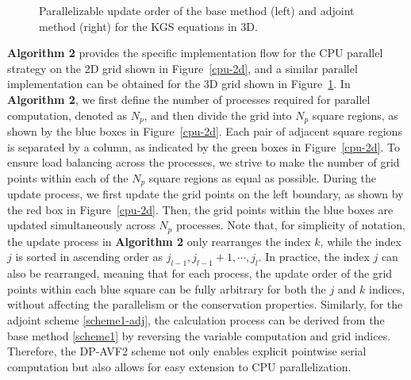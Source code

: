 \documentclass[fleqn,11pt]{elsarticle}
\numberwithin{equation}{section}
\begin{document}
\begin{figure}[H]
\begin{minipage}{0.45\textwidth}
	\end{minipage}


	\caption{Parallelizable update order of the base method (left) and adjoint method (right) for the KGS equations in 3D.}\label{cpu-3d}
\end{figure}


{\bf Algorithm 2} provides the specific implementation flow for the CPU parallel strategy on the 2D grid shown in Figure~\ref{cpu-2d}, and a similar parallel implementation can be obtained for the 3D grid shown in Figure~\ref{cpu-3d}. In {\bf Algorithm 2}, we first define the number of processes required for parallel computation, denoted as $N_p$, and then divide the grid into $N_p$ square regions, as shown by the blue boxes in Figure~\ref{cpu-2d}. Each pair of adjacent square regions is separated by a column, as indicated by the green boxes in Figure~\ref{cpu-2d}. To ensure load balancing across the processes, we strive to make the number of grid points within each of the $N_p$ square regions as equal as possible. During the update process, we first update the grid points on the left boundary, as shown by the red box in Figure~\ref{cpu-2d}. Then, the grid points within the blue boxes are updated simultaneously across $N_p$ processes. Note that, for simplicity of notation, the update process in {\bf Algorithm 2} only rearranges the index $k$, while the index $j$ is sorted in ascending order as $ j_{l-1}, j_{l-1}+1, \cdots, j_l $. In practice, the index $j$ can also be rearranged, meaning that for each process, the update order of the grid points within each blue square can be fully arbitrary for both the $j$ and $k$ indices, without affecting the parallelism or the conservation properties. Similarly, for the adjoint scheme \eqref{scheme1-adj}, the calculation process can be derived from the base method \eqref{scheme1} by reversing the variable computation and grid indices. Therefore, the DP-AVF2 scheme not only enables explicit pointwise serial computation but also allows for easy extension to CPU parallelization.
\end{document}
